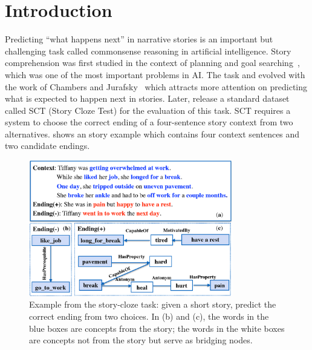 \section{Introduction}
\label{sec:intro}
Predicting ``what happens next'' in narrative stories is an important
but challenging task called commonsense reasoning in artificial intelligence.
Story comprehension was first studied in the context of 
planning and goal searching~\cite{meehan1977tale}, which was one of the
most important problems in AI. The task and evolved with
the work of Chambers and Jurafsky~
which attracts more attention on predicting what is expected to happen next in stories.
Later,  release a standard dataset called
SCT (Story Cloze Test) for the evaluation of this task.
SCT requires a system to choose the correct ending of a four-sentence
story context from two alternatives.
 shows an story example which
contains four context sentences and two candidate endings.


\begin{figure}[th]
\centering\includegraphics[width=3.5in]{pictures/story_example}
\caption{Example from the story-cloze task: given a short story, predict the correct ending from two choices. In (b) and (c), the words in the blue boxes are concepts from the story; the words in the white boxes are concepts not from the story but serve as bridging nodes.}
\label{fig:story}
\end{figure}

